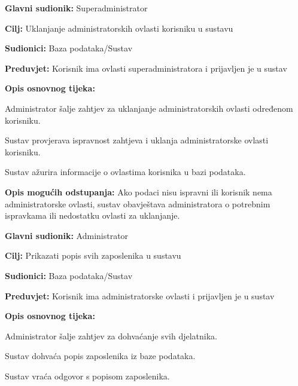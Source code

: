 \noindent {}
\begin{packed_item}
	
	\item \textbf{Glavni sudionik: }Superadministrator
	\item  \textbf{Cilj:} Uklanjanje administratorskih ovlasti korisniku u sustavu
	\item  \textbf{Sudionici:} Baza podataka/Sustav
	\item  \textbf{Preduvjet:} Korisnik ima ovlasti superadministratora i prijavljen je u sustav
	\item  \textbf{Opis osnovnog tijeka:}
	
	\item[] \begin{packed_enum}
		
		\item Administrator šalje zahtjev za uklanjanje administratorskih ovlasti određenom korisniku.
		\item Sustav provjerava ispravnost zahtjeva i uklanja administratorske ovlasti korisniku.
		\item Sustav ažurira informacije o ovlastima korisnika u bazi podataka.
		
	\end{packed_enum}
	
	\item  \textbf{Opis mogućih odstupanja:} Ako podaci nisu ispravni ili korisnik nema administratorske ovlasti, sustav obavještava administratora o potrebnim ispravkama ili nedostatku ovlasti za uklanjanje.
	
	
\end{packed_item}

\noindent {}
\begin{packed_item}
	
	\item \textbf{Glavni sudionik: }Administrator
	\item  \textbf{Cilj:} Prikazati popis svih zaposlenika u sustavu
	\item  \textbf{Sudionici:} Baza podataka/Sustav
	\item  \textbf{Preduvjet:} Korisnik ima administratorske ovlasti i prijavljen je u sustav
	\item  \textbf{Opis osnovnog tijeka:}
	
	\item[] \begin{packed_enum}
		
		\item Administrator šalje zahtjev za dohvaćanje svih djelatnika.
		\item Sustav dohvaća popis zaposlenika iz baze podataka.
		\item Sustav vraća odgovor s popisom zaposlenika.
		
	\end{packed_enum}
	
	
\end{packed_item}

